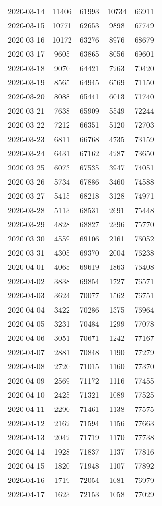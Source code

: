 \begin{longtable}{ccccc}
2020-03-14&11406&61993&10734&66911\\
2020-03-15&10771&62653&9898&67749\\
2020-03-16&10172&63276&8976&68679\\
2020-03-17&9605&63865&8056&69601\\
2020-03-18&9070&64421&7263&70420\\
2020-03-19&8565&64945&6569&71150\\
2020-03-20&8088&65441&6013&71740\\
2020-03-21&7638&65909&5549&72244\\
2020-03-22&7212&66351&5120&72703\\
2020-03-23&6811&66768&4735&73159\\
2020-03-24&6431&67162&4287&73650\\
2020-03-25&6073&67535&3947&74051\\
2020-03-26&5734&67886&3460&74588\\
2020-03-27&5415&68218&3128&74971\\
2020-03-28&5113&68531&2691&75448\\
2020-03-29&4828&68827&2396&75770\\
2020-03-30&4559&69106&2161&76052\\
2020-03-31&4305&69370&2004&76238\\
2020-04-01&4065&69619&1863&76408\\
2020-04-02&3838&69854&1727&76571\\
2020-04-03&3624&70077&1562&76751\\
2020-04-04&3422&70286&1375&76964\\
2020-04-05&3231&70484&1299&77078\\
2020-04-06&3051&70671&1242&77167\\
2020-04-07&2881&70848&1190&77279\\
2020-04-08&2720&71015&1160&77370\\
2020-04-09&2569&71172&1116&77455\\
2020-04-10&2425&71321&1089&77525\\
2020-04-11&2290&71461&1138&77575\\
2020-04-12&2162&71594&1156&77663\\
2020-04-13&2042&71719&1170&77738\\
2020-04-14&1928&71837&1137&77816\\
2020-04-15&1820&71948&1107&77892\\
2020-04-16&1719&72054&1081&76979\\
2020-04-17&1623&72153&1058&77029\\

\end{longtable}
